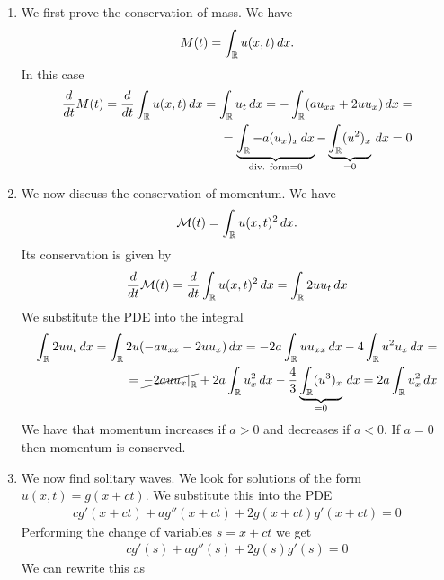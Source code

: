\begin{enumerate}
    \item We first prove the conservation of mass. We have
    \[
        M(t) = \int_{\mathbb{R}} u(x, t) \, dx.
    \]
    In this case 
    \[
        \begin{split}
            \frac{d}{dt} M(t) = \frac{d}{dt} \int_{\mathbb{R}} u(x, t) \, dx = \int_{\mathbb{R}} u_t \, dx = -\int_{\mathbb{R}} (a u_{xx} + 2 u u_x) \, dx = \\ 
            = \underbrace{\int_{\mathbb{R}} -a(u_x)_x \, dx}_{\text{div. form} = 0} - \underbrace{\int_{\mathbb{R}} (u^2)_x}_{=0} \, dx = 0
        \end{split}
    \]
    \item We now discuss the conservation of momentum. We have
    \[
        \begin{split}
            \mathcal{M}(t) = \int_{\mathbb{R}} u(x, t) ^2 \, dx.
        \end{split}
    \]
    Its conservation is given by
    \[
        \begin{split}
            \frac{d}{dt} \mathcal{M}(t) = \frac{d}{dt} \int_{\mathbb{R}} u(x, t)^2 \, dx = \int_{\mathbb{R}} 2 u u_t \, dx 
        \end{split}
    \]
    We substitute the PDE into the integral
    \[
        \begin{split}
            \int_{\mathbb{R}} 2 u u_t \, dx = \int_{\mathbb{R}} 2 u (-a u_{xx} - 2 u u_x) \, dx = -2a \int_{\mathbb{R}} u u_{xx} \, dx - 4 \int_{\mathbb{R}} u^2 u_x \, dx = \\ 
            = \cancel{\left. -2a u u_x \right|_{\mathbb{R}}} + 2a \int_{\mathbb{R}} u_x^2 \, dx - \frac{4}{3} \underbrace{\int_{\mathbb{R}} (u^3)_x }_{=0} \, dx = 2a \int_{\mathbb{R}} u_x^2 \, dx
        \end{split}
    \]
    We have that momentum increases if \(a > 0\) and decreases if \(a < 0\). If \(a = 0\) then momentum is conserved.
    \item We now find solitary waves. We look for solutions of the form \(u(x, t) = g(x + ct)\). We substitute this into the PDE
    \[
        \begin{split}
            cg'(x + ct) + a g''(x + ct) + 2 g(x + ct) g'(x + ct) = 0
        \end{split}
    \]
    Performing the change of variables \(s = x + ct\) we get
    \[
        \begin{split}
            cg'(s) + a g''(s) + 2 g(s) g'(s) = 0
        \end{split}
    \]
    We can rewrite this as
    \[
        \begin{split}

\end{split}\]
\end{enumerate}
